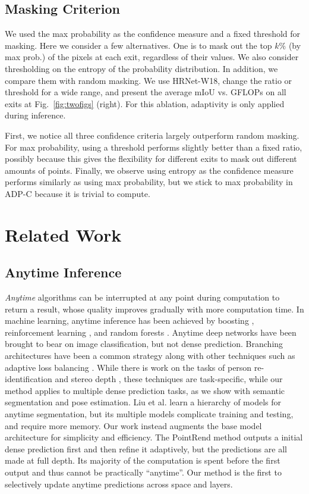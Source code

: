 \subsection{Masking Criterion}
We used the max probability as the confidence measure and a fixed threshold for masking.
Here we consider a few alternatives.
One is to mask out the top $k\%$ (by max prob.) of the pixels at each exit, regardless of their values.
We also consider thresholding on the entropy of the probability distribution.
In addition, we compare them with random masking.
We use HRNet-W18, change the ratio or threshold for a wide range, and present the average mIoU vs. GFLOPs on all exits at Fig.~\ref{fig:twofigs} (right). 
For this ablation, adaptivity is only applied during inference.


First, we notice all three confidence criteria largely outperform random masking.
For max probability, using a threshold performs slightly better than a fixed ratio, possibly because this gives the flexibility for different exits to mask out different amounts of points.
Finally, we observe using entropy as the confidence measure performs similarly as using max probability, but we stick to max probability in ADP-C because it is trivial to compute.

\section{Related Work}
\subsection{Anytime Inference} 
\emph{Anytime} algorithms \cite{zilberstein1996using,dean1988analysis} can be interrupted at any point during computation to return a result, whose quality improves gradually with more computation time.
In machine learning, anytime inference has been achieved by boosting \cite{grubb2012speedboost}, reinforcement learning \cite{karayev2014anytime}, and random forests \cite{frohlich2012time}.
Anytime deep networks have been brought to bear on image classification, but not dense prediction.
Branching architectures have been a common strategy \cite{amthor2016impatient,teerapittayanon2016branchynet} along with other techniques such as
adaptive loss balancing \cite{hu2019learning}.
While there is work on the tasks of person re-identification \cite{wang2019anytime} and stereo depth \cite{wang2018resource}, these techniques are task-specific, while our method applies to multiple dense prediction tasks, as we show with semantic segmentation and pose estimation.
Liu et al. \cite{liu2016learning} learn a hierarchy of models for anytime segmentation, but its multiple models complicate training and testing, and require more memory. 
Our work instead augments the base model architecture for simplicity and efficiency. The PointRend method \cite{kirillov2020pointrend} outputs a initial dense prediction first and then refine it adaptively, but the predictions are all made at full depth. Its majority of the computation is spent before the first output and thus cannot be practically ``anytime''.
Our method is the first to selectively update anytime predictions across space and layers.


